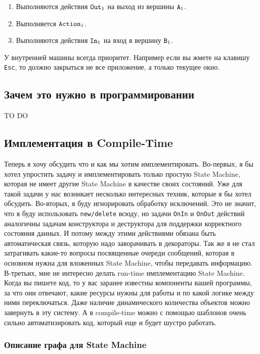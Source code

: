 \documentclass{article}
\begin{document}
{\begin{enumerate}
\begin{enumerate}
\item Выполняются действия $\verb"Out"_1$ на выход из вершины $\verb"A"_1$.

\item Выполняется $\verb"Action"_1$.

\item Выполняются действия $\verb"In"_1$ на вход в вершину $\verb"B"_1$.
\end{enumerate}
\end{enumerate}
У внутренней машины всегда приоритет.
Например если вы жмете на клавишу \verb"Esc", то должно закрыться не все приложение, а только текущее окно.

\subsection{Зачем это нужно в программировании}

TO DO

\subsection{Имплементация в Compile-Time}

Теперь я хочу обсудить что и как мы хотим имплементировать.
Во-первых, я бы хотел упростить задачу и имплементировать только простую State Machine, которая не имеет другие State Machine в качестве своих состояний.
Уже для такой задачи у нас возникает несколько интересных техник, которые я бы хотел обсудить.
Во-вторых, я буду игнорировать обработку исключений.
Это не значит, что я буду использовать \verb"new/delete" всюду, но задачи \verb"OnIn" и \verb"OnOut" действий аналогичны задачам конструктора и деструктора для поддержки корректного состояния данных.
И потому между этими действиями обязана быть автоматическая связь, которую надо заворачивать в декораторы.
Так же я не стал затрагивать какие-то вопросы посвященные очереди сообщений, которая в основном нужна для вложенных State Machine, чтобы передавать информацию.
В-третьих, мне не интересно делать run-time имплементацию State Machine.
Когда вы пишете код, то у вас заранее известны компоненты вашей программы, за что они отвечают, какие ресурсы нужны для работы и по какой логике между ними переключаться.
Даже наличие динамического количества объектов можно завернуть в эту систему.
А в compile-time можно с помощью шаблонов очень сильно автоматизировать код, который еще и будет шустро работать.

\subsubsection{Описание графа для State Machine}

}
\end{document}
